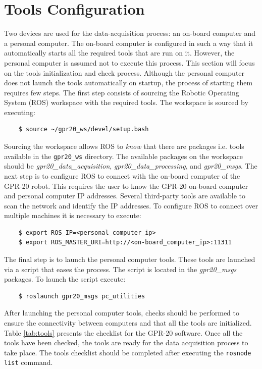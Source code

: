 \documentclass{article}
\begin{document}
\section{Tools Configuration}
Two devices are used for the data-acquisition process: an on-board computer and a personal computer. The on-board computer is configured in such a way that it automatically starts all the required tools that are run on it. However, the personal computer is assumed not to execute this process. This section will focus on the tools initialization and check process. Although the personal computer does not launch the tools automatically on startup, the process of starting them requires few steps. The first step consists of sourcing the Robotic Operating System (ROS) workspace with the required tools. The workspace is sourced by executing: 
\begin{verbatim}
    $ source ~/gpr20_ws/devel/setup.bash
\end{verbatim}
Sourcing the workspace allows ROS to \textit{know} that there are packages i.e. tools available in the \texttt{gpr20\_ws} directory. The available packages on the workspace should be \textit{gpr20\_data\_acquisition}, \textit{gpr20\_data\_processing}, and \textit{gpr20\_msgs}. The next step is to configure ROS to connect with the on-board computer of the GPR-20 robot. This requires the user to know the GPR-20 on-board computer and personal computer IP addresses. Several third-party tools are available to scan the network and identify the IP addresses. To configure ROS to connect over multiple machines it is necessary to execute:
\begin{verbatim}
    $ export ROS_IP=<personal_computer_ip> 
    $ export ROS_MASTER_URI=http://<on-board_computer_ip>:11311 
\end{verbatim}
The final step is to launch the personal computer tools. These tools are launched via a script that eases the process. The script is located in the \textit{gpr20\_msgs} packages. To launch the script execute:
\begin{verbatim}
    $ roslaunch gpr20_msgs pc_utilities
\end{verbatim}
After launching the personal computer tools, checks should be performed to ensure the connectivity between computers and that all the tools are initialized. Table \ref{tab:tools} presents the checklist for the GPR-20 software. Once all the tools have been checked, the tools are ready for the data acquisition process to take place. The tools checklist should be completed after executing the \texttt{rosnode list} command.
\end{document}
